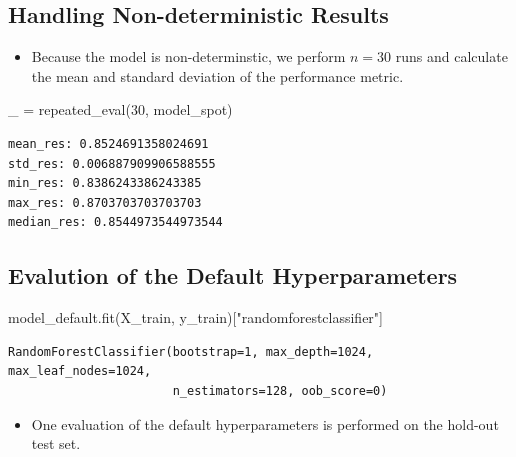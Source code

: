 \documentclass[
  letterpaper,
  DIV=11,
  numbers=noendperiod]{scrreprt}
\newenvironment{Shaded}{\begin{snugshade}}{\end{snugshade}}
\newcommand{\DecValTok}[1]{\textcolor[rgb]{0.68,0.00,0.00}{#1}}
\newcommand{\NormalTok}[1]{\textcolor[rgb]{0.00,0.23,0.31}{#1}}
\newcommand{\OperatorTok}[1]{\textcolor[rgb]{0.37,0.37,0.37}{#1}}
\newcommand{\StringTok}[1]{\textcolor[rgb]{0.13,0.47,0.30}{#1}}
\providecommand{\tightlist}{%
  \setlength{\itemsep}{0pt}\setlength{\parskip}{0pt}}\usepackage{longtable,booktabs,array}
\begin{document}
\hypertarget{handling-non-deterministic-results}{%
\subsection{Handling Non-deterministic
Results}\label{handling-non-deterministic-results}}

\begin{itemize}
\tightlist
\item
  Because the model is non-determinstic, we perform \(n=30\) runs and
  calculate the mean and standard deviation of the performance metric.
\end{itemize}

\begin{Shaded}
\begin{Highlighting}[]
\NormalTok{\_ }\OperatorTok{=}\NormalTok{ repeated\_eval(}\DecValTok{30}\NormalTok{, model\_spot)}
\end{Highlighting}
\end{Shaded}

\begin{verbatim}
mean_res: 0.8524691358024691
std_res: 0.006887909906588555
min_res: 0.8386243386243385
max_res: 0.8703703703703703
median_res: 0.8544973544973544
\end{verbatim}

\hypertarget{evalution-of-the-default-hyperparameters}{%
\subsection{Evalution of the Default
Hyperparameters}\label{evalution-of-the-default-hyperparameters}}

\begin{Shaded}
\begin{Highlighting}[]
\NormalTok{model\_default.fit(X\_train, y\_train)[}\StringTok{"randomforestclassifier"}\NormalTok{]}
\end{Highlighting}
\end{Shaded}

\begin{verbatim}
RandomForestClassifier(bootstrap=1, max_depth=1024, max_leaf_nodes=1024,
                       n_estimators=128, oob_score=0)
\end{verbatim}

\begin{itemize}
\tightlist
\item
  One evaluation of the default hyperparameters is performed on the
  hold-out test set.
\end{itemize}
\end{document}
